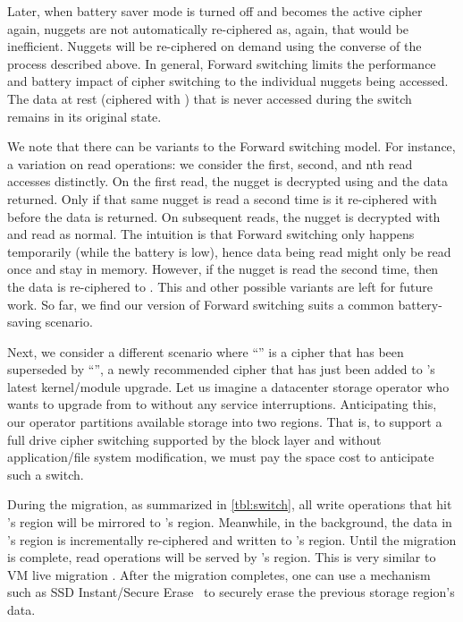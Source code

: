 Later, when battery saver mode is turned off and \cone becomes the active cipher
again, nuggets are not automatically re-ciphered as, again, that would be
inefficient. Nuggets will be re-ciphered on demand using the converse of the
process described above. In general, Forward switching limits the performance
and battery impact of cipher switching to the individual nuggets being accessed.
The data at rest (ciphered with \cone) that is never accessed during the switch
remains in its original state.

We note that there can be variants to the Forward switching model. For instance,
a variation on read operations: we consider the first, second, and nth read
accesses distinctly. On the first read, the nugget is decrypted using \cone and
the data returned. Only if that same nugget is read a second time is it
re-ciphered with \ctwo before the data is returned. On subsequent reads, the
nugget is decrypted with \ctwo and read as normal. The intuition is that Forward
switching only happens temporarily (\eg while the battery is low), hence data
being read might only be read once and stay in memory. However, if the nugget is
read the second time, then the data is re-ciphered to \ctwo. This and other
possible variants are left for future work. So far, we find our version of
Forward switching suits a common battery-saving scenario.



 Next, we consider a different scenario where
``\cone'' is a cipher that has been superseded by ``\ctwo'', a newly recommended
cipher that has just been added to \sys's latest kernel/module upgrade. Let us
imagine a datacenter storage operator who wants to upgrade from \cone to \ctwo
without any service interruptions. Anticipating this, our operator partitions
available storage into two regions. That is, to support a full drive cipher
switching supported by the block layer and without application/file system
modification, we must pay the space cost to anticipate such a switch.

During the migration, as summarized in \cref{tbl:switch}, all write operations
that hit \cone's region will be mirrored to \ctwo's region. Meanwhile, in the
background, the data in \cone's region is incrementally re-ciphered and written
to \ctwo's region. Until the migration is complete, read operations will be
served by \cone's region. This is very similar to VM live migration
\cite{live-vm-migration}. After the migration completes, one can use a mechanism
such as SSD Instant/Secure Erase~\cite{ISE1,ISE2,ISE3} to securely erase the
previous storage region's data.

